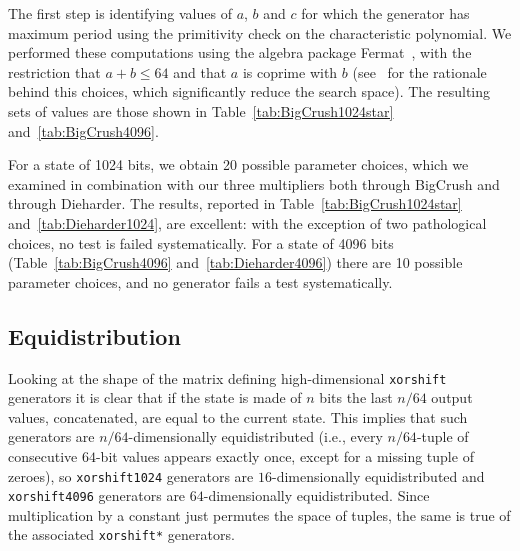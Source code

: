 \documentclass{acmsmalltr}
\newcommand{\xorshift}[1][]{\texttt{xorshift#1}\xspace}
\newcommand{\xorshifts}[1][]{\texttt{xorshift#1*}\xspace}
\begin{document}
The first step is identifying values of $a$, $b$ and $c$ for which the
generator has maximum period using the primitivity check on the characteristic polynomial.
We performed these computations using the algebra package Fermat~\cite{LewF},
with the restriction that $a+b\leq 64$ and that $a$ is coprime with $b$
(see~\cite{BreSLPRNGUSX} for the rationale behind this choices, which
significantly reduce the search space). The resulting sets of values are those
shown in Table~\ref{tab:BigCrush1024star} and~\ref{tab:BigCrush4096}.

For a state of 1024 bits, we obtain 20 possible parameter choices, which we examined in combination with our
three multipliers both through BigCrush and through Dieharder. The results, reported in 
Table~\ref{tab:BigCrush1024star} and~\ref{tab:Dieharder1024}, are excellent: 
with the exception of two pathological choices, no test is failed 
systematically. For a state of 4096 bits (Table~\ref{tab:BigCrush4096}
and~\ref{tab:Dieharder4096}) there are 10 possible parameter choices, 
and no generator fails a test systematically.




\subsection{Equidistribution}

Looking at the shape of the matrix defining high-dimensional \xorshift
generators it is clear that if the state is made of $n$ bits the last
$n/64$ output values, concatenated, are equal to the current state. This implies
that such generators are $n/64$-dimensionally equidistributed (i.e.,
every $n/64$-tuple of consecutive $64$-bit values appears exactly once, except
for a missing tuple of zeroes), so \xorshift[1024] generators are $16$-dimensionally
equidistributed and \xorshift[4096] generators are $64$-dimensionally
equidistributed. Since multiplication by a constant just permutes the space of
tuples, the same is true of the associated \xorshifts generators.
\end{document}
